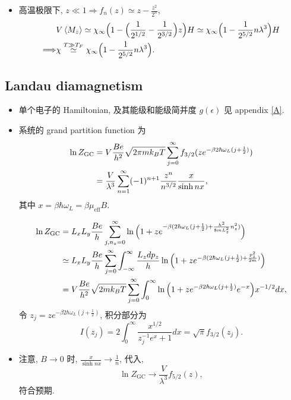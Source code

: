 \begin{itemize}
\begin{itemize}
		\item 高温极限下, $z \ll 1 \Longrightarrow f_n(z) \simeq z - \frac{z^2}{2^n}$,
		\begin{align}
			& V \braket{M_z} \simeq \chi_\infty \Big( 1 - \Big( \frac{1}{2^{1 / 2}} - \frac{1}{2^{3 / 2}} \Big) z \Big) H \simeq \chi_\infty \Big( 1 - \frac{1}{2^{5 / 2}} n \lambda^3 \Big) H \notag \\
			\Longrightarrow & \chi \overset{T \gg T_F}{\simeq} \chi_\infty \Big( 1 - \frac{1}{2^{5 / 2}} n \lambda^3 \Big).
		\end{align}
	\end{itemize}
\end{itemize}

\subsection{Landau diamagnetism}
\begin{itemize}
	\item 单个电子的 Hamiltonian, 及其能级和能级简并度 $g(\epsilon)$ 见 appendix \ref{A}.
	
	\item 系统的 grand partition function 为
	\begin{align}
		\ln Z_\text{GC} &= V \frac{B e}{h^2} \sqrt{2 \pi m k_B T} \sum_{j = 0}^\infty f_{3 / 2}(z e^{- \beta 2 \hbar \omega_L (j + \frac{1}{2})}) \notag \\
		&= \frac{V}{\lambda^3} \sum_{n = 1}^\infty (- 1)^{n + 1} \frac{z^n}{n^{3 / 2}} \frac{x}{\sinh n x},
	\end{align}
	其中 $x = \beta \hbar \omega_L = \beta \mu_\text{eff} B$.
	
	\begin{tcolorbox}[title=calculation:]
		\begin{align}
			\ln Z_\text{GC} &= L_x L_y \frac{B e}{h} \sum_{j, n_z = 0}^\infty \ln \Big( 1 + z e^{- \beta (2 \hbar \omega_L (j + \frac{1}{2}) + \frac{h^2}{8 m L_z^2} n_z^2)} \Big) \notag \\
			&\simeq L_x L_y \frac{B e}{h} \sum_{j = 0}^\infty \int_{- \infty}^\infty \frac{L_z dp_z}{h} \ln \Big( 1 + z e^{- \beta (2 \hbar \omega_L (j + \frac{1}{2}) + \frac{p_z^2}{2 m})} \Big) \notag \\
			&= V \frac{B e}{h^2} \sqrt{2 m k_B T} \sum_{j = 0}^\infty \int_0^\infty \ln \Big( 1 + z e^{- \beta 2 \hbar \omega_L (j + \frac{1}{2})} e^{- x} \Big) x^{- 1 / 2} dx,
		\end{align}
		令 $z_j = z e^{- \beta 2 \hbar \omega_L (j + \frac{1}{2})}$, 积分部分为
		\begin{equation}
			I(z_j) = 2 \int_0^\infty \frac{x^{1 / 2}}{z_j^{- 1} e^{x} + 1} dx = \sqrt{\pi} f_{3 / 2}(z_j).
		\end{equation}
	\end{tcolorbox}
	
	\item 注意, $B \rightarrow 0$ 时, $\frac{x}{\sinh n x} \rightarrow \frac{1}{n}$, 代入,
	\begin{equation}
		\ln Z_\text{GC} \rightarrow \frac{V}{\lambda^3} f_{5 / 2}(z),
	\end{equation}
	符合预期.
\end{itemize}

